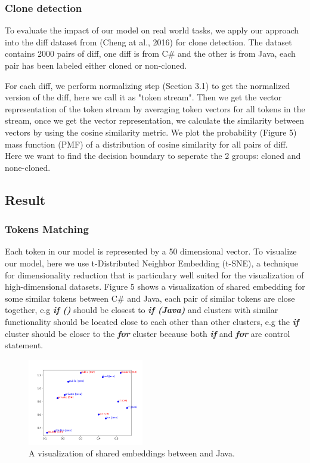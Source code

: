 \subsubsection{Clone detection}
To evaluate the impact of our model on real world tasks, we apply our approach into the diff dataset from (Cheng at al., 2016)\cite{cheng2017clcminer} for clone detection. The dataset contains 2000 pairs of diff, one diff is from C\# and the other is from Java, each pair has been labeled either cloned or non-cloned. 

For each diff, we perform normalizing step (Section 3.1) to get the normalized version of the diff, here we call it as "token stream". Then we get the vector representation of the token stream by averaging token vectors for all tokens in the stream, once we get the vector representation, we calculate the similarity between vectors by using the cosine similarity metric. We plot the probability (Figure 5) mass function (PMF) of a distribution of cosine similarity for all pairs of diff. Here we want to find the decision boundary to seperate the 2 groups: cloned and none-cloned.

\subsection{Result}
\subsubsection{Tokens Matching}
Each token in our model is represented by a 50 dimensional vector. To visualize our model, here we use t-Distributed Neighbor Embedding (t-SNE)\cite{maaten2008visualizing}, a technique for dimensionality reduction that is particulary well suited for the visualization of high-dimensional datasets. Figure 5 shows a visualization of shared embedding for some similar tokens between C\# and Java, each pair of similar tokens are close together, e.g \textit{\textbf{if ()}} should be closest to \textit{\textbf{if (Java)}} and clusters with similar functionality should be located close to each other than other clusters, e.g the \textit{\textbf{if}} cluster should be closer to the \textit{\textbf{for}} cluster because both \textit{\textbf{if}} and \textit{\textbf{for}} are control statement.

\begin{figure}[t!]
	\includegraphics[width=0.45\textwidth]{example_bi2vec_tsne}
	\caption{A visualization of shared embeddings between  and Java.}
	\label{fig:clf}
\end{figure}

